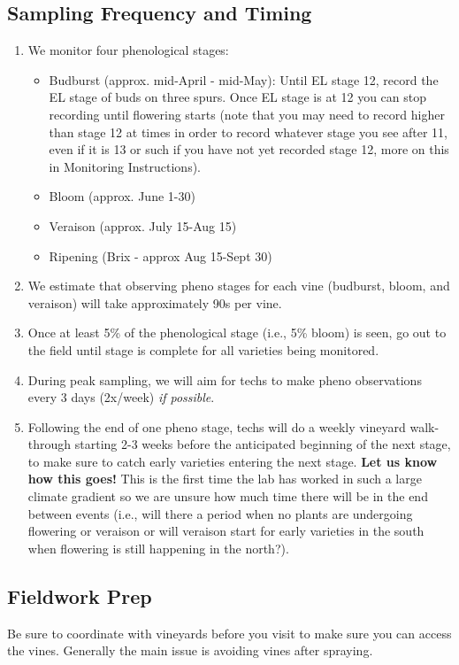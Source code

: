 \documentclass[11pt,letter]{article}
\newenvironment{smitemize}{
\begin{itemize}
  \setlength{\itemsep}{0pt}
  \setlength{\parskip}{0.8pt}
  \setlength{\parsep}{0pt}}
{\end{itemize}
}
\begin{document}
\subsection{Sampling Frequency and Timing}

\begin{enumerate}
\item We monitor four phenological stages: 
	\begin{smitemize}
	\item Budburst (approx. mid-April - mid-May): Until EL stage 12, record the EL stage of buds on three spurs. Once EL stage is at 12 you can stop recording until flowering starts (note that you may need to record higher than stage 12 at times in order to record whatever stage you see after 11, even if it is 13 or such if you have not yet recorded stage 12, more on this in Monitoring Instructions).
	\item Bloom (approx. June 1-30)
	\item Veraison (approx. July 15-Aug 15)
	\item Ripening (Brix - approx Aug 15-Sept 30)
	\end{smitemize}
\item We estimate that observing pheno stages for each vine (budburst, bloom, and veraison) will take approximately 90s per vine. 
\item Once at least 5\% of the phenological stage (i.e., 5\% bloom) is seen, go out to the field until stage is complete for all varieties being monitored. 
\item During peak sampling, we will aim for techs to make pheno observations every 3 days (2x/week) \emph{if possible}.  
\item Following the end of one pheno stage, techs will do a weekly vineyard walk-through starting 2-3 weeks before the anticipated beginning of the next stage, to make sure to catch early varieties entering the next stage. {\bf Let us know how this goes!} This is the first time the lab has worked in such a large climate gradient so we are unsure how much time there will be in the end between events (i.e., will there a period when no plants are undergoing flowering or veraison or will veraison start for early varieties in the south when flowering is still happening in the north?).
\end{enumerate}

\subsection{Fieldwork Prep}
Be sure to coordinate with vineyards before you visit to make sure you can access the vines. Generally the main issue is avoiding vines after spraying.\\
\end{document}

